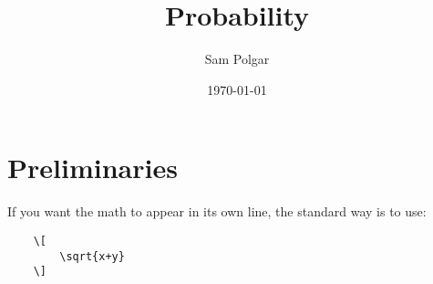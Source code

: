\documentclass[10pt]{article}
\begin{document}
\title{Probability}

\author{%
   Sam Polgar%
}

\date{\today}

\maketitle

\section{Preliminaries}



% 

% 








If you want the math to appear in its own line, the standard way is to use:

\begin{verbatim}
    \[
        \sqrt{x+y}
    \]
\end{verbatim}




%    
%    
\end{document}
